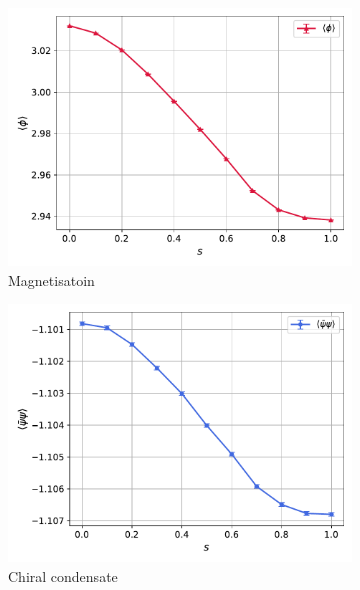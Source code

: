 \begin{figure}
    \centering
    \begin{subfigure}[b]{0.45\textwidth}
        \includegraphics[width=\textwidth]{figures/slide_broken/magnetisation.pdf}
        \caption{Magnetisatoin}
    \end{subfigure}
    \begin{subfigure}[b]{0.45\textwidth}
        \includegraphics[width=\textwidth]{figures/slide_broken/condensate.pdf}
        \caption{Chiral condensate}
    \end{subfigure}
    \begin{subfigure}[b]{0.45\textwidth}

\end{subfigure}
\end{figure}
